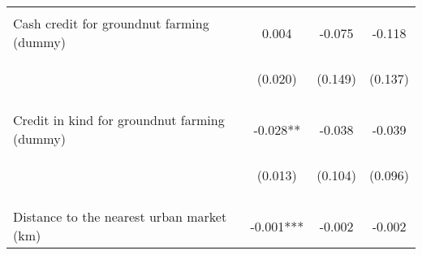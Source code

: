 \begin{center}
\begin{tabular}{lccc}
\vspace{4pt} & \begin{footnotesize}[0.206]\end{footnotesize} & \begin{footnotesize}[0.022]\end{footnotesize} & \begin{footnotesize}[0.122]\end{footnotesize} \\
Cash credit for groundnut farming (dummy) & 0.004 & -0.075 & -0.118 \\
 & \begin{footnotesize}(0.020)\end{footnotesize} & \begin{footnotesize}(0.149)\end{footnotesize} & \begin{footnotesize}(0.137)\end{footnotesize} \\
\vspace{4pt} & \begin{footnotesize}[0.822]\end{footnotesize} & \begin{footnotesize}[0.614]\end{footnotesize} & \begin{footnotesize}[0.389]\end{footnotesize} \\
Credit in kind for groundnut farming (dummy) & -0.028** & -0.038 & -0.039 \\
 & \begin{footnotesize}(0.013)\end{footnotesize} & \begin{footnotesize}(0.104)\end{footnotesize} & \begin{footnotesize}(0.096)\end{footnotesize} \\
\vspace{4pt} & \begin{footnotesize}[0.036]\end{footnotesize} & \begin{footnotesize}[0.717]\end{footnotesize} & \begin{footnotesize}[0.681]\end{footnotesize} \\
Distance to the nearest urban market (km) & -0.001*** & -0.002 & -0.002 \\

\end{tabular}
\end{center}

